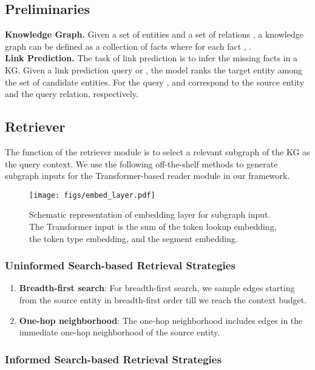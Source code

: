 \subsection{Preliminaries}
\noindent \textbf{Knowledge Graph.} Given a set of entities  and a set of relations , a knowledge graph can be defined as a collection of facts  where for each fact , .\\

\noindent \textbf{Link Prediction.} The task of link prediction is to infer the missing facts in a KG\@. Given a link prediction query  or , the model ranks the target entity among the set of candidate entities. For the query ,  and  correspond to the source entity and the query relation, respectively.
\subsection{Retriever}
The function of the retriever module is to select a relevant subgraph of the KG as the query context.
We use the following off-the-shelf methods to generate subgraph inputs for the Transformer-based reader module in our framework.

\begin{figure*}[htbp]
  \centering
  \texttt{[image: figs/embed\_layer.pdf]}
  \caption{Schematic representation of embedding layer for subgraph input. The Transformer input is the sum of the token lookup embedding, the token type embedding, and the segment embedding.}
  \label{fig:model_embed}
\end{figure*}

\subsubsection{Uninformed Search-based Retrieval Strategies}
\begin{enumerate}[label=\alph*)]
\item\textbf{Breadth-first search}: For breadth-first search, we sample edges starting from the source entity in breadth-first order till we reach the context budget.
\item\textbf{One-hop neighborhood}: The one-hop neighborhood includes edges in the immediate one-hop neighborhood of the source entity.
\end{enumerate}

\subsubsection{Informed Search-based Retrieval Strategies}

